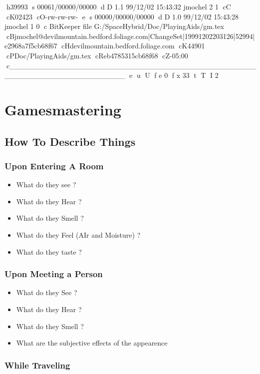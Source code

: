 h39993
s 00061/00000/00000
d D 1.1 99/12/02 15:43:32 jmochel 2 1
cC
cK02423
cO-rw-rw-rw-
e
s 00000/00000/00000
d D 1.0 99/12/02 15:43:28 jmochel 1 0
c BitKeeper file G:/SpaceHybrid/Doc/PlayingAids/gm.tex
cBjmochel@devilmountain.bedford.foliage.com|ChangeSet|19991202203126|52994|e2968a7f5cb68f67
cHdevilmountain.bedford.foliage.com
cK44901
cPDoc/PlayingAids/gm.tex
cReb4785315cb68f68
cZ-05:00
c______________________________________________________________________
e
u
U
f e 0
f x 33
t
T
I 2
\chapter{Gamesmastering}

\section{How To Describe Things}

\subsection{Upon Entering A Room}

\begin{itemize}
    \item What do they see ?
    \item What do they Hear ?
    \item What do they Smell ?
    \item What do they Feel (AIr and Moisture) ?
    \item What do they taste ?
\end{itemize}

\subsection{Upon Meeting a Person }

\begin{itemize}
    \item What do they See ? 
    \item What do they Hear ?
    \item What do they Smell ?
    \item What are the subjective effects of the appearence
\end{itemize}

\subsection{While Traveling}

